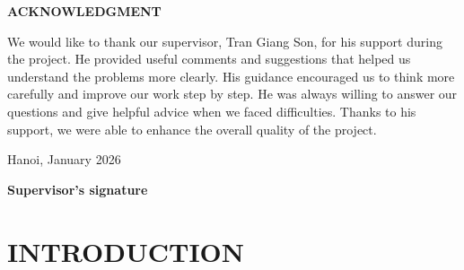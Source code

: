\documentclass[a4paper,12pt]{report}
\begin{document}
\thispagestyle{empty}
\begin{center}
    \Large \textbf{ACKNOWLEDGMENT}
\end{center}

\vspace{1cm}

{
\linespread{1.3}\selectfont
\setlength{\parskip}{1em}
\setlength{\parindent}{1.5em}

We would like to thank our supervisor, Tran Giang Son, for his support during the project. He provided useful comments and suggestions that helped us understand the problems more clearly. His guidance encouraged us to think more carefully and improve our work step by step. He was always willing to answer our questions and give helpful advice when we faced difficulties. Thanks to his support, we were able to enhance the overall quality of the project.

\noindent Hanoi, January 2026
}

\vspace{3cm}

\noindent \textbf{Supervisor’s signature}


\newpage

{
\linespread{1.3}\selectfont
\setlength{\parskip}{0.5em}

\tableofcontents
{}
\newpage

\listoffigures
{}
\newpage

\listoftables
{}
}
\newpage

\chapter{INTRODUCTION}

\setlength{\parindent}{0pt} %
\setlength{\parskip}{1.2em} %
\linespread{1.3}\selectfont %
\titlespacing*{\section}{0pt}{12pt}{4pt} %
\end{document}
